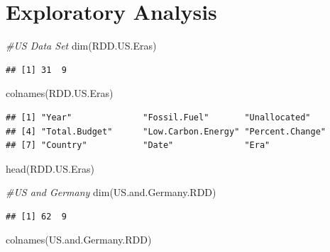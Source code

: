 \documentclass[
  12pt,
]{article}
\newenvironment{Shaded}{\begin{snugshade}}{\end{snugshade}}
\newcommand{\CommentTok}[1]{\textcolor[rgb]{0.56,0.35,0.01}{\textit{#1}}}
\newcommand{\FunctionTok}[1]{\textcolor[rgb]{0.00,0.00,0.00}{#1}}
\newcommand{\NormalTok}[1]{#1}
\begin{document}
\newpage

\hypertarget{exploratory-analysis}{%
\section{Exploratory Analysis}\label{exploratory-analysis}}

\begin{Shaded}
\begin{Highlighting}[]
\CommentTok{\#US Data Set}
\FunctionTok{dim}\NormalTok{(RDD.US.Eras)}
\end{Highlighting}
\end{Shaded}

\begin{verbatim}
## [1] 31  9
\end{verbatim}

\begin{Shaded}
\begin{Highlighting}[]
\FunctionTok{colnames}\NormalTok{(RDD.US.Eras)}
\end{Highlighting}
\end{Shaded}

\begin{verbatim}
## [1] "Year"              "Fossil.Fuel"       "Unallocated"      
## [4] "Total.Budget"      "Low.Carbon.Energy" "Percent.Change"   
## [7] "Country"           "Date"              "Era"
\end{verbatim}

\begin{Shaded}
\begin{Highlighting}[]
\FunctionTok{head}\NormalTok{(RDD.US.Eras)}
\end{Highlighting}
\end{Shaded}

\begin{Shaded}
\begin{Highlighting}[]
\CommentTok{\#US and Germany}
\FunctionTok{dim}\NormalTok{(US.and.Germany.RDD)}
\end{Highlighting}
\end{Shaded}

\begin{verbatim}
## [1] 62  9
\end{verbatim}

\begin{Shaded}
\begin{Highlighting}[]
\FunctionTok{colnames}\NormalTok{(US.and.Germany.RDD)}
\end{Highlighting}
\end{Shaded}
\end{document}
